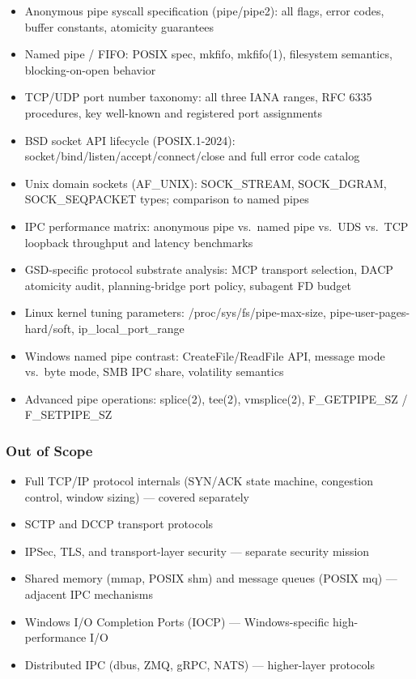 \documentclass[11pt,letterpaper]{article}
\begin{document}
\begin{itemize}[leftmargin=1.5em]
  \item Anonymous pipe syscall specification (pipe/pipe2): all flags, error codes, buffer constants, atomicity guarantees
  \item Named pipe / FIFO: POSIX spec, mkfifo, mkfifo(1), filesystem semantics, blocking-on-open behavior
  \item TCP/UDP port number taxonomy: all three IANA ranges, RFC 6335 procedures, key well-known and registered port assignments
  \item BSD socket API lifecycle (POSIX.1-2024): socket/bind/listen/accept/connect/close and full error code catalog
  \item Unix domain sockets (AF\_UNIX): SOCK\_STREAM, SOCK\_DGRAM, SOCK\_SEQPACKET types; comparison to named pipes
  \item IPC performance matrix: anonymous pipe vs.\ named pipe vs.\ UDS vs.\ TCP loopback throughput and latency benchmarks
  \item GSD-specific protocol substrate analysis: MCP transport selection, DACP atomicity audit, planning-bridge port policy, subagent FD budget
  \item Linux kernel tuning parameters: /proc/sys/fs/pipe-max-size, pipe-user-pages-hard/soft, ip\_local\_port\_range
  \item Windows named pipe contrast: CreateFile/ReadFile API, message mode vs.\ byte mode, SMB IPC share, volatility semantics
  \item Advanced pipe operations: splice(2), tee(2), vmsplice(2), F\_GETPIPE\_SZ / F\_SETPIPE\_SZ
\end{itemize}

\subsubsection{Out of Scope}

\begin{itemize}[leftmargin=1.5em]
  \item Full TCP/IP protocol internals (SYN/ACK state machine, congestion control, window sizing) --- covered separately
  \item SCTP and DCCP transport protocols
  \item IPSec, TLS, and transport-layer security --- separate security mission
  \item Shared memory (mmap, POSIX shm) and message queues (POSIX mq) --- adjacent IPC mechanisms
  \item Windows I/O Completion Ports (IOCP) --- Windows-specific high-performance I/O
  \item Distributed IPC (dbus, ZMQ, gRPC, NATS) --- higher-layer protocols
\end{itemize}
\end{document}
